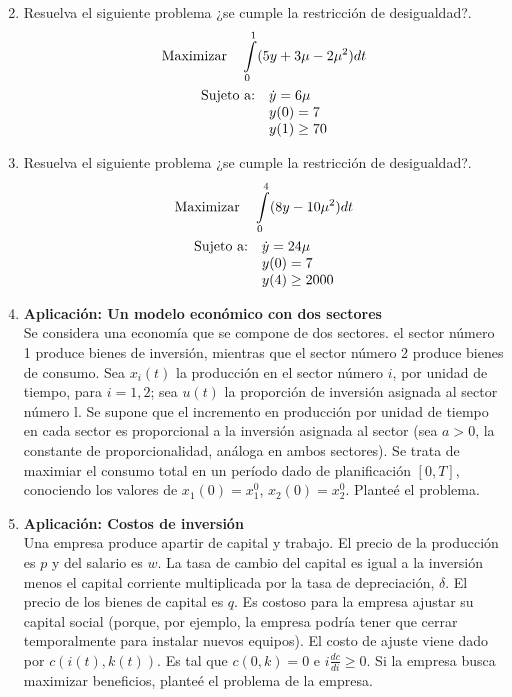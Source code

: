 \documentclass[10pt,a4paper]{article}
\begin{document}
\begin{enumerate}
\begin{gather*}
		\end{gather*}
		\item Resuelva el siguiente problema ¿se cumple la restricción de desigualdad?.
		\begin{gather*}
			\textup{Maximizar}\quad \int\limits_{0}^{1}(5y+3\mu-2\mu^2)dt\\
			\begin{array}{lllll}
				\textup{Sujeto a:}	&	\dot{y}=6\mu \\
				&	y(0)=7 \\
				&	y(1)\geq 70
			\end{array}
		\end{gather*}
		\item Resuelva el siguiente problema ¿se cumple la restricción de desigualdad?.
		\begin{gather*}
			\textup{Maximizar}\quad \int\limits_{0}^{4}(8y-10\mu^2)dt\\
			\begin{array}{lllll}
				\textup{Sujeto a:}	&	\dot{y}=24\mu \\
				&	y(0)=7 \\
				&	y(4)\geq 2000
			\end{array}
		\end{gather*}
		\item \textbf{Aplicación: Un modelo económico con dos sectores}\\
		Se considera una economía que se compone de dos sectores. el sector número 1 produce bienes de inversión, mientras que el sector número 2 produce bienes de consumo. Sea $x_i(t)$ la producción en el sector número $i$, por unidad de tiempo, para $i = 1, 2$; sea $u(t)$ la proporción de inversión asignada al sector número l. Se supone que el incremento en producción por unidad de tiempo en cada sector es proporcional a la inversión asignada al sector (sea $a>0$, la constante de proporcionalidad, análoga en ambos sectores). Se trata de maximiar el consumo total en un período dado de planificación $[0, T]$, conociendo los valores de $x_1(0) =x_{1}^{0}$, $x_2(0) =x_{2}^{0}$. Planteé el problema.
		\item \textbf{Aplicación: Costos de inversión}\\
		Una empresa produce apartir de capital y trabajo. El precio de la producción es $p$ y del salario es $w$. La tasa de cambio del capital es igual a la inversión menos el capital corriente multiplicada por la tasa de depreciación, $\delta$. El precio de los bienes de capital es $q$. Es costoso para la empresa ajustar su capital social (porque, por ejemplo, la empresa podría tener que cerrar temporalmente para instalar nuevos equipos). El costo de ajuste viene dado por $c(i(t), k(t))$. Es tal que $c(0, k)=0$ e $i\frac{dc}{di}\geq 0$. Si la empresa busca maximizar beneficios, planteé el problema de la empresa.

\end{enumerate}
\end{document}
